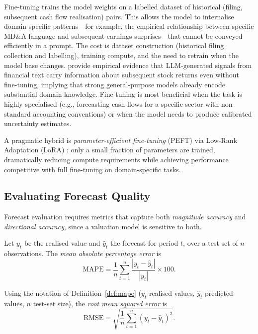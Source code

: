 \begin{deepdive}
Fine-tuning trains the model weights on a labelled dataset of historical
(filing, subsequent cash flow realisation) pairs. This allows the model to internalise
domain-specific patterns---for example, the empirical relationship between specific
MD\&A language and subsequent earnings surprises---that cannot be conveyed efficiently
in a prompt. The cost is dataset construction (historical filing collection and
labelling), training compute, and the need to retrain when the model base changes.
\citet{LopezLiraTang2023} provide empirical evidence that LLM-generated signals
from financial text carry information about subsequent stock returns even without
fine-tuning, implying that strong general-purpose models already encode substantial
domain knowledge. Fine-tuning is most beneficial when the task is highly specialised
(e.g., forecasting cash flows for a specific sector with non-standard accounting
conventions) or when the model needs to produce calibrated uncertainty estimates.

A pragmatic hybrid is \emph{parameter-efficient fine-tuning} (PEFT) via Low-Rank
Adaptation (LoRA) \cite{hu2022lora}:
only a small fraction of parameters are trained, dramatically reducing compute
requirements while achieving performance competitive with full fine-tuning on
domain-specific tasks.

\subsection{Evaluating Forecast Quality}
\label{subsec:bv-forecasting-evaluation}

Forecast evaluation requires metrics that capture both \emph{magnitude accuracy}
and \emph{directional accuracy}, since a valuation model is sensitive to both.

\begin{definition}
\label{def:mape}
Let $y_t$ be the realised value and $\hat{y}_t$ the forecast for period $t$, over a
test set of $n$ observations. The \emph{mean absolute percentage error} is
\begin{equation}
\label{eq:mape}
\mathrm{MAPE} = \frac{1}{n}\sum_{t=1}^{n} \frac{|y_t - \hat{y}_t|}{|y_t|} \times 100.
\end{equation}
\end{definition}

\begin{definition}
\label{def:rmse}
Using the notation of Definition~\ref{def:mape} ($y_t$ realised values, $\hat{y}_t$ predicted values, $n$ test-set size), the \emph{root mean squared error} is
\begin{equation}
\label{eq:rmse}
\mathrm{RMSE} = \sqrt{\frac{1}{n}\sum_{t=1}^{n}(y_t - \hat{y}_t)^2}.
\end{equation}
\end{definition}


\end{deepdive}
